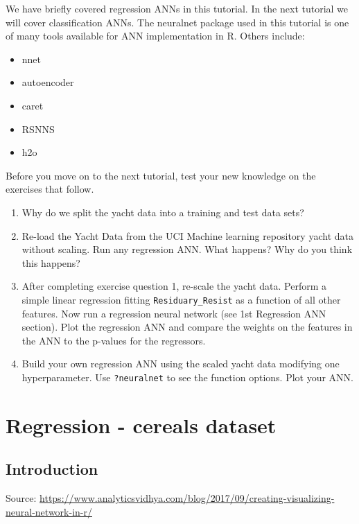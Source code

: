 \documentclass[]{book}
\providecommand{\tightlist}{%
  \setlength{\itemsep}{0pt}\setlength{\parskip}{0pt}}
\begin{document}
We have briefly covered regression ANNs in this tutorial. In the next tutorial we will cover classification ANNs. The neuralnet package used in this tutorial is one of many tools available for ANN implementation in R. Others include:

\begin{itemize}
\tightlist
\item
  nnet
\item
  autoencoder
\item
  caret
\item
  RSNNS
\item
  h2o
\end{itemize}

Before you move on to the next tutorial, test your new knowledge on the exercises that follow.

\begin{enumerate}
\def\labelenumi{\arabic{enumi}.}
\item
  Why do we split the yacht data into a training and test data sets?
\item
  Re-load the Yacht Data from the UCI Machine learning repository yacht data without scaling. Run any regression ANN. What happens? Why do you think this happens?
\item
  After completing exercise question 1, re-scale the yacht data. Perform a simple linear regression fitting \texttt{Residuary\_Resist} as a function of all other features. Now run a regression neural network (see 1st Regression ANN section). Plot the regression ANN and compare the weights on the features in the ANN to the p-values for the regressors.
\item
  Build your own regression ANN using the scaled yacht data modifying one hyperparameter. Use \texttt{?neuralnet} to see the function options. Plot your ANN.
\end{enumerate}

\hypertarget{regression---cereals-dataset}{%
\chapter{Regression - cereals dataset}\label{regression---cereals-dataset}}

\hypertarget{introduction-6}{%
\section{Introduction}\label{introduction-6}}

Source: \url{https://www.analyticsvidhya.com/blog/2017/09/creating-visualizing-neural-network-in-r/}
\end{document}
